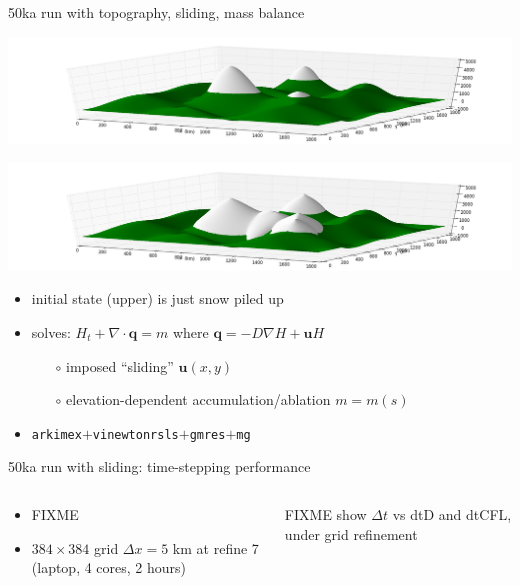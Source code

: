 \documentclass[hide notes,intlimits,usenames,dvipsnames]{beamer}
\newcommand{\Div}{\nabla\cdot}
\newcommand{\grad}{\nabla}
\begin{document}
\begin{frame}{50ka run with topography, sliding, mass balance}
\begin{center}
\includegraphics[height=0.25\textheight]{startsheet.png}

\includegraphics[height=0.25\textheight]{endsheet.png}
\end{center}

\begin{itemize}
\item initial state (upper) is just snow piled up
\item solves: $H_t + \Div \mathbf{q} = m$ where $\mathbf{q} = -D\grad H + \mathbf{u} H$
    \begin{itemize}
    \item[$\circ$] imposed ``sliding'' $\mathbf{u}(x,y)$
    \item[$\circ$] elevation-dependent accumulation/ablation $m=m(s)$
    \end{itemize}
\item \texttt{arkimex}$+$\texttt{vinewtonrsls}$+$\texttt{gmres}$+$\texttt{mg}
\end{itemize}
\end{frame}


\begin{frame}{50ka run with sliding: time-stepping performance}
\begin{columns}
\begin{column}{0.4\textwidth}
\begin{itemize}
\item FIXME
\item $384\times 384$ grid $\Delta x = 5$ km at refine 7 (laptop, 4 cores, 2 hours)
\end{itemize}
\end{column}
\begin{column}{0.6\textwidth}
FIXME  show $\Delta t$ vs dtD and dtCFL, under grid refinement
\end{column}
\end{columns}
\end{frame}
\end{document}
